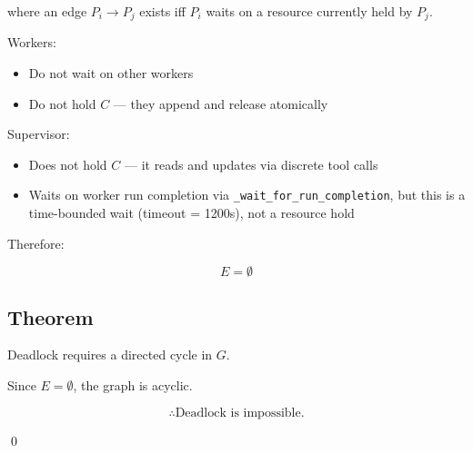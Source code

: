 where an edge $P_i \rightarrow P_j$ exists iff $P_i$ waits on a resource
currently held by $P_j$.

Workers:

\begin{itemize}
  \item Do not wait on other workers
  \item Do not hold $C$ — they append and release atomically
\end{itemize}

Supervisor:

\begin{itemize}
  \item Does not hold $C$ — it reads and updates via discrete tool calls
  \item Waits on worker run completion via \texttt{\_wait\_for\_run\_completion},
        but this is a time-bounded wait (timeout = 1200s), not a resource hold
\end{itemize}

Therefore:

\[ E = \emptyset \]

\subsection*{Theorem}

Deadlock requires a directed cycle in $G$.

Since $E = \emptyset$, the graph is acyclic.

\[ \therefore \text{Deadlock is impossible.} \]

\qed